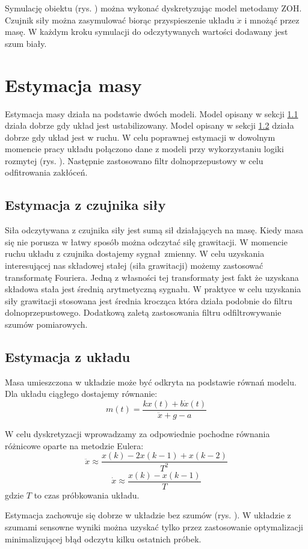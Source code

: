\documentclass[a4paper]{article}
\begin{document}
Symulację obiektu (rys. ) można wykonać dyskretyzując model metodamy ZOH. Czujnik siły można zasymulować biorąc przyspieszenie układu $\ddot{x}$ i mnożąć przez masę. W każdym kroku symulacji do odczytywanych wartości dodawany jest szum biały.

\section{Estymacja masy}
Estymacja masy działa na podstawie dwóch modeli. Model opisany w sekcji \ref{fs} działa dobrze gdy układ jest ustabilizowany. Model opisany w sekcji \ref{pos} działa dobrze gdy układ jest w ruchu. W celu poprawnej estymacji w dowolnym momencie pracy układu połączono dane z modeli przy wykorzystaniu logiki rozmytej (rys. ). Następnie zastosowano filtr dolnoprzepustowy w celu odfitrowania zakłóceń.
  
\subsection{Estymacja z czujnika siły}
\label{fs}
Siła odczytywana z czujnika siły jest sumą sił działających na masę. Kiedy masa się nie porusza w łatwy sposób można odczytać siłę grawitacji. W momencie ruchu układu z czujnika dostajemy sygnał zmienny. W celu uzyskania interesującej nas składowej stałej (siła grawitacji) możemy zastosować transformatę Fouriera. Jedną z własności tej transformaty jest fakt że uzyskana składowa stała jest średnią arytmetyczną sygnału. W praktyce w celu uzyskania siły grawitacji stosowana jest średnia krocząca która działa podobnie do filtru dolnoprzepustowego. Dodatkową zaletą zastosowania filtru odfiltrowywanie szumów pomiarowych.

\subsection{Estymacja z  układu}
\label{pos}
Masa umieszczona w układzie może być odkryta na podstawie równań modelu. Dla układu ciągłego dostajemy równanie:
\[ m(t) = \frac{kx(t) + b\dot{x}(t)}{\ddot{x}+g-a}\]

W celu dyskretyzacji wprowadzamy za odpowiednie pochodne równania różnicowe oparte na metodzie Eulera:
\[\ddot{x} \approx \frac{x(k)-2x(k-1)+x(k-2)}{T^2}\]
\[\dot{x} \approx \frac{x(k)-x(k-1)}{T}\]
gdzie $T$ to czas próbkowania układu.

Estymacja zachowuje się dobrze w układzie bez szumów (rys. ). W układzie z szumami sensowne wyniki można uzyskać tylko przez zastosowanie optymalizacji minimalizującej błąd odczytu kilku ostatnich próbek.
\end{document}
